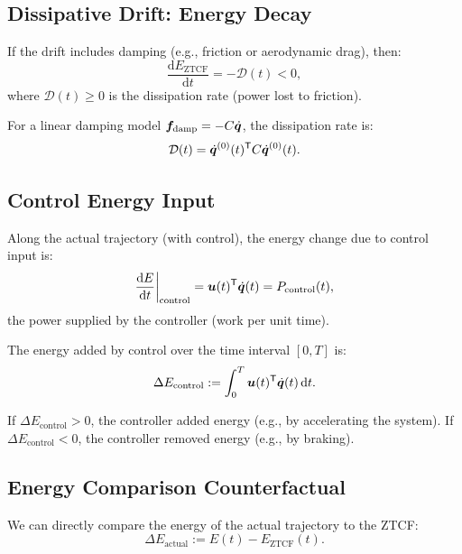 \subsection{Dissipative Drift: Energy Decay}

If the drift includes damping (e.g., friction or aerodynamic drag), then:
\begin{equation}
\frac{\mathrm{d}E_{\text{ZTCF}}}{\mathrm{d}t} = -\mathcal{D}(t) < 0,
\label{eq:ch7:energy-dissipation}
\end{equation}
where $\mathcal{D}(t) \geq 0$ is the dissipation rate (power lost to friction).

For a linear damping model $\bm{f}_{\text{damp}} = -C\dot{\bm{q}}$, the dissipation rate is:
\begin{equation}
\mathcal{D}(t) = \dot{\bm{q}}^{(0)}(t)^{\mathsf{T}} C \dot{\bm{q}}^{(0)}(t).
\label{eq:ch7:dissipation-rate}
\end{equation}

\subsection{Control Energy Input}

Along the actual trajectory (with control), the energy change due to control input is:
\begin{equation}
\frac{\mathrm{d}E}{\mathrm{d}t}\bigg|_{\text{control}} = \bm{u}(t)^{\mathsf{T}} \dot{\bm{q}}(t) = P_{\text{control}}(t),
\label{eq:ch7:control-power}
\end{equation}
the power supplied by the controller (work per unit time).

The energy added by control over the time interval $[0,T]$ is:
\begin{equation}
\Delta E_{\text{control}} := \int_0^T \bm{u}(t)^{\mathsf{T}} \dot{\bm{q}}(t) \, \mathrm{d}t.
\label{eq:ch7:energy-added}
\end{equation}

If $\Delta E_{\text{control}} > 0$, the controller added energy (e.g., by accelerating the
system). If $\Delta E_{\text{control}} < 0$, the controller removed energy (e.g., by braking).

\subsection{Energy Comparison Counterfactual}

We can directly compare the energy of the actual trajectory to the ZTCF:
\begin{equation}
\Delta E_{\text{actual}} := E(t) - E_{\text{ZTCF}}(t).
\label{eq:ch7:energy-difference}
\end{equation}

